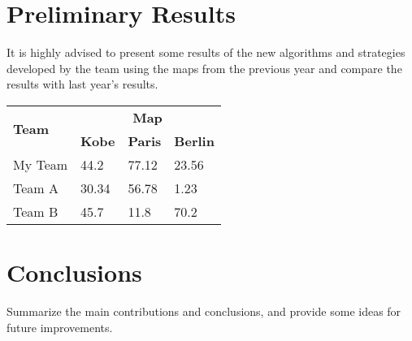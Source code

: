 \documentclass[runningheads,a4paper]{llncs}
\begin{document}
\section{Preliminary Results}
It is highly advised to present some results of the new algorithms and
strategies developed by the team using the maps from the previous year and
compare the results with last year's results.
\begin{table}
  \begin{tabular}{llll}
    \hline
    \multirow{2}{*}{\textbf{Team}}  & \multicolumn{3}{c}{\textbf{Map}}\\
    \cline{2-4}
                                    & \textbf{Kobe} & \textbf{Paris}  & \textbf{Berlin}\\
    \hline
    My Team                         & 44.2          & 77.12           & 23.56\\
    Team A                          & 30.34         & 56.78           & 1.23\\
    Team B                          & 45.7          & 11.8            & 70.2\\
    \hline
  \end{tabular}
\end{table}
\section{Conclusions}
Summarize the main contributions and conclusions, and provide some ideas for
future improvements.


\end{document}
